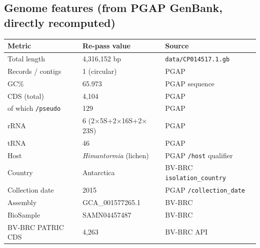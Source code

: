 \documentclass[11pt,letterpaper]{article}
\begin{document}
\subsection{Genome features (from PGAP GenBank, directly recomputed)}
\begin{tabularx}{\linewidth}{@{}l l X@{}}
\toprule
Metric & Re-pass value & Source \\
\midrule
Total length     & 4{,}316{,}152 bp             & \texttt{data/CP014517.1.gb} \\
Records / contigs& 1 (circular)                 & PGAP \\
GC\%             & 65.973                       & PGAP sequence \\
CDS (total)      & 4{,}104                      & PGAP \\
\quad of which \texttt{/pseudo} & 129           & PGAP \\
rRNA             & 6 (2$\times$5S+2$\times$16S+2$\times$23S) & PGAP \\
tRNA             & 46                           & PGAP \\
Host             & \textit{Himantormia} (lichen)& PGAP \texttt{/host} qualifier \\
Country          & Antarctica                   & BV-BRC \texttt{isolation\_country} \\
Collection date  & 2015                         & PGAP \texttt{/collection\_date} \\
Assembly         & GCA\_001577265.1             & BV-BRC \\
BioSample        & SAMN04457487                 & BV-BRC \\
BV-BRC PATRIC CDS& 4{,}263                      & BV-BRC API \\
\bottomrule
\end{tabularx}
\end{document}
